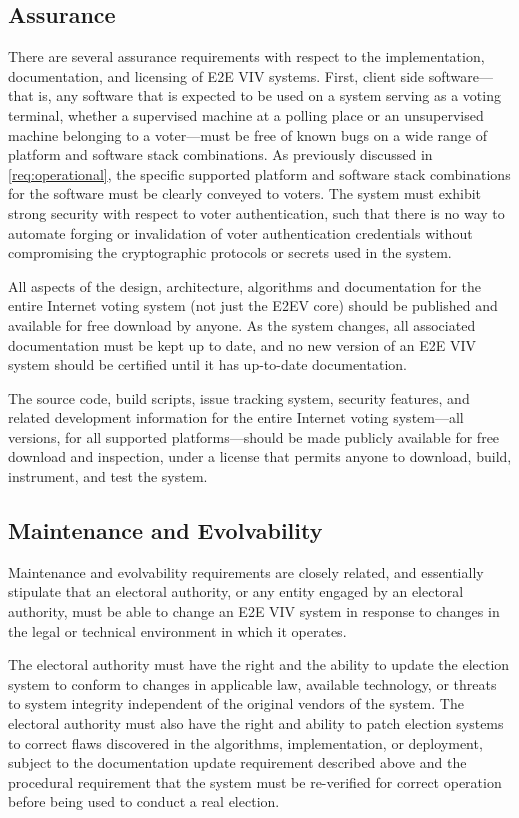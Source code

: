 \subsection{Assurance}

There are several assurance requirements with respect to the
implementation, documentation, and licensing of E2E VIV
systems. First, client side software---that is, any software that is
expected to be used on a system serving as a voting terminal, whether
a supervised machine at a polling place or an unsupervised machine
belonging to a voter---must be free of known bugs on a wide range of
platform and software stack combinations. As previously discussed in
\autoref{req:operational}, the specific supported platform and
software stack combinations for the software must be clearly conveyed
to voters. The system must exhibit strong security with respect to
voter authentication, such that there is no way to automate forging or
invalidation of voter authentication credentials without compromising
the cryptographic protocols or secrets used in the system.

All aspects of the design, architecture, algorithms and documentation
for the entire Internet voting system (not just the E2EV core) should
be published and available for free download by anyone. As the system
changes, all associated documentation must be kept up to date, and no
new version of an E2E VIV system should be certified until it has
up-to-date documentation. 

The source code, build scripts, issue tracking system, security
features, and related development information for the entire Internet
voting system---all versions, for all supported platforms---should be
made publicly available for free download and inspection, under a
license that permits anyone to download, build, instrument, and test
the system.

\subsection{Maintenance and Evolvability}

Maintenance and evolvability requirements are closely related, and
essentially stipulate that an electoral authority, or any entity
engaged by an electoral authority, must be able to change an E2E VIV
system in response to changes in the legal or technical environment in
which it operates. 

The electoral authority must have the right and the ability to update
the election system to conform to changes in applicable law, available
technology, or threats to system integrity independent of the original
vendors of the system. The electoral authority must also have the
right and ability to patch election systems to correct flaws
discovered in the algorithms, implementation, or deployment, subject
to the documentation update requirement described above and the
procedural requirement that the system must be re-verified for correct
operation before being used to conduct a real election.
